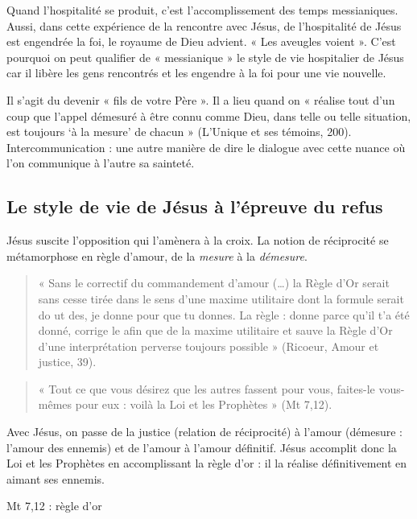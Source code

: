 \begin{Def}
Quand l’hospitalité se produit, c’est l’accomplissement des temps
messianiques. Aussi, dans cette expérience de la rencontre avec Jésus, de l’hospitalité de
Jésus est engendrée la foi, le royaume de Dieu advient. « Les aveugles voient ». C’est
pourquoi on peut qualifier de « messianique » le style de vie hospitalier de Jésus car il libère
les gens rencontrés et les engendre à la foi pour une vie nouvelle.
\end{Def}

\begin{Def}[Engendrement]
Il s’agit du devenir « fils de votre Père ». Il a lieu quand on « réalise tout
d’un coup que l’appel démesuré à être connu comme Dieu, dans telle ou telle situation, est
toujours ‘à la mesure’ de chacun » (L’Unique et ses témoins, 200).
Intercommunication : une autre manière de dire le dialogue avec cette nuance où l’on
communique à l’autre sa sainteté.
\end{Def}
\subsection{Le style de vie de Jésus à l’épreuve du refus}

Jésus suscite l'opposition qui l'amènera à la croix. La notion de réciprocité se métamorphose en règle d'amour, de la \textit{mesure} à la \textit{démesure}. 
\begin{quote}
    « Sans le correctif du commandement d’amour (…) la Règle d’Or serait sans cesse tirée dans le sens d’une maxime utilitaire dont la formule serait do ut des, je donne pour que tu donnes. La règle : donne parce qu’il t’a été donné, corrige le afin que de la maxime utilitaire et sauve la Règle d’Or d’une interprétation perverse toujours possible » (Ricoeur, Amour et justice, 39). 
\end{quote}


\begin{Def}[Règle d’or]
 \begin{quote}
     « Tout ce que vous désirez que les autres fassent pour vous, faites-le vous-mêmes
pour eux : voilà la Loi et les Prophètes » (Mt 7,12). 
 \end{quote} Avec Jésus, on passe de la justice
(relation de réciprocité) à l’amour (démesure : l’amour des ennemis) et de l’amour à l’amour
définitif. Jésus accomplit donc la Loi et les Prophètes en accomplissant la règle d’or : il la
réalise définitivement en aimant ses ennemis.
\end{Def}
Mt 7,12 : règle d'or
\begin{quote}
    
\end{quote}


